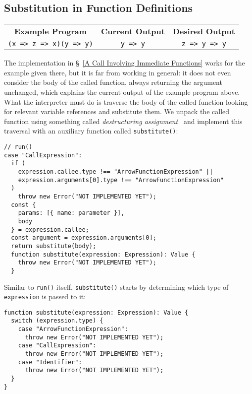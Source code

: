 \documentclass[12pt, oneside]{book}
\begin{document}
\subsection{Substitution in Function Definitions}
\label{Substitution in Function Definitions}

\begin{center}
\begin{tabular}{c|c|c}
\textbf{Example Program} & \textbf{Current Output} & \textbf{Desired Output} \\
\texttt{(x => z => x)(y => y)} & \texttt{y => y} & \texttt{z => y => y} \\
\end{tabular}
\end{center}

\noindent The implementation in §~\ref{A Call Involving Immediate Functions} works for the example given there, but it is far from working in general: it does not even consider the body of the called function, always returning the argument unchanged, which explains the current output of the example program above. What the interpreter must do is traverse the body of the called function looking for relevant variable references and substitute them. We unpack the called function using something called \emph{destructuring assignment}~\cite{destructuring-assignment} and implement this traversal with an auxiliary function called \texttt{substitute()}:

\begin{verbatim}
// run()
case "CallExpression":
  if (
    expression.callee.type !== "ArrowFunctionExpression" ||
    expression.arguments[0].type !== "ArrowFunctionExpression"
  )
    throw new Error("NOT IMPLEMENTED YET");
  const {
    params: [{ name: parameter }],
    body
  } = expression.callee;
  const argument = expression.arguments[0];
  return substitute(body);
  function substitute(expression: Expression): Value {
    throw new Error("NOT IMPLEMENTED YET");
  }
\end{verbatim}

Similar to \texttt{run()} itself, \texttt{substitute()} starts by determining which type of \texttt{expression} is passed to it:

\begin{verbatim}
function substitute(expression: Expression): Value {
  switch (expression.type) {
    case "ArrowFunctionExpression":
      throw new Error("NOT IMPLEMENTED YET");
    case "CallExpression":
      throw new Error("NOT IMPLEMENTED YET");
    case "Identifier":
      throw new Error("NOT IMPLEMENTED YET");
  }
}
\end{verbatim}
\end{document}
